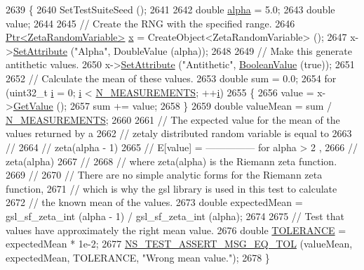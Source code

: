\begin{DoxyCode}
2639 \{
2640   SetTestSuiteSeed ();
2641 
2642   \textcolor{keywordtype}{double} \hyperlink{lte__uplink__power__control_8m_a62197192f0fbf4e0675eb37be1c4c175}{alpha} = 5.0;
2643   \textcolor{keywordtype}{double} value;
2644 
2645   \textcolor{comment}{// Create the RNG with the specified range.}
2646   \hyperlink{classns3_1_1Ptr}{Ptr<ZetaRandomVariable>} \hyperlink{lte__link__budget__x2__handover__measures_8m_a9336ebf25087d91c818ee6e9ec29f8c1}{x} = CreateObject<ZetaRandomVariable> ();
2647   x->\hyperlink{classns3_1_1ObjectBase_ac60245d3ea4123bbc9b1d391f1f6592f}{SetAttribute} (\textcolor{stringliteral}{"Alpha"}, DoubleValue (alpha));
2648 
2649   \textcolor{comment}{// Make this generate antithetic values.}
2650   x->\hyperlink{classns3_1_1ObjectBase_ac60245d3ea4123bbc9b1d391f1f6592f}{SetAttribute} (\textcolor{stringliteral}{"Antithetic"}, \hyperlink{classns3_1_1BooleanValue}{BooleanValue} (\textcolor{keyword}{true}));
2651 
2652   \textcolor{comment}{// Calculate the mean of these values.}
2653   \textcolor{keywordtype}{double} sum = 0.0;
2654   \textcolor{keywordflow}{for} (uint32\_t \hyperlink{bernuolliDistribution_8m_a6f6ccfcf58b31cb6412107d9d5281426}{i} = 0; \hyperlink{bernuolliDistribution_8m_a6f6ccfcf58b31cb6412107d9d5281426}{i} < \hyperlink{classRandomVariableStreamZetaAntitheticTestCase_a0a981bdb2baa96c4abbf5dfb6b1533b9}{N\_MEASUREMENTS}; ++\hyperlink{bernuolliDistribution_8m_a6f6ccfcf58b31cb6412107d9d5281426}{i})
2655     \{
2656       value = x->\hyperlink{classns3_1_1ZetaRandomVariable_a8ab47b42912943fe4eea82bdd250d42a}{GetValue} ();
2657       sum += value;
2658     \}
2659   \textcolor{keywordtype}{double} valueMean = sum / \hyperlink{classRandomVariableStreamZetaAntitheticTestCase_a0a981bdb2baa96c4abbf5dfb6b1533b9}{N\_MEASUREMENTS};
2660 
2661   \textcolor{comment}{// The expected value for the mean of the values returned by a}
2662   \textcolor{comment}{// zetaly distributed random variable is equal to }
2663   \textcolor{comment}{//}
2664   \textcolor{comment}{//                   zeta(alpha - 1)}
2665   \textcolor{comment}{//     E[value]  =  ---------------   for alpha > 2 ,}
2666   \textcolor{comment}{//                     zeta(alpha)}
2667   \textcolor{comment}{//                          }
2668   \textcolor{comment}{// where zeta(alpha) is the Riemann zeta function.}
2669   \textcolor{comment}{//                 }
2670   \textcolor{comment}{// There are no simple analytic forms for the Riemann zeta function,}
2671   \textcolor{comment}{// which is why the gsl library is used in this test to calculate}
2672   \textcolor{comment}{// the known mean of the values.}
2673   \textcolor{keywordtype}{double} expectedMean = gsl\_sf\_zeta\_int (alpha - 1) / gsl\_sf\_zeta\_int (alpha);
2674 
2675   \textcolor{comment}{// Test that values have approximately the right mean value.}
2676   \textcolor{keywordtype}{double} \hyperlink{spectrum-value-test_8cc_a30c17564229ec2e37dfea9c6c9ad643e}{TOLERANCE} = expectedMean * 1e-2;
2677   \hyperlink{group__testing_ga9e7861b56b4e70db3b56044cb7a28e41}{NS\_TEST\_ASSERT\_MSG\_EQ\_TOL} (valueMean, expectedMean, TOLERANCE, \textcolor{stringliteral}{"Wrong mean
       value."}); 
2678 \}
\end{DoxyCode}


